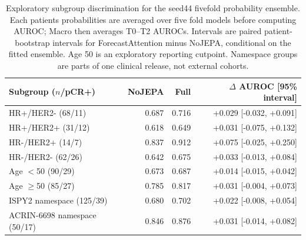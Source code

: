 \begin{table}[t]
\centering
\small
\caption{Exploratory subgroup discrimination for the seed44 fivefold probability ensemble. Each patient\textquotesingle s probabilities are averaged over five fold models before computing AUROC; Macro then averages T0--T2 AUROCs. Intervals are paired patient-bootstrap intervals for ForecastAttention minus NoJEPA, conditional on the fitted ensemble. Age 50 is an exploratory reporting cutpoint. Namespace groups are parts of one clinical release, not external cohorts.}
\label{tab:subgroups}
\begin{tabular}{lrrr}
\toprule
Subgroup ($n$/pCR+) & NoJEPA & Full & $\Delta$ AUROC [95\% interval] \\
\midrule
HR+/HER2- (68/11) & 0.687 & 0.716 & +0.029 [-0.032, +0.091] \\
HR+/HER2+ (31/12) & 0.618 & 0.649 & +0.031 [-0.075, +0.132] \\
HR-/HER2+ (14/7) & 0.837 & 0.912 & +0.075 [-0.025, +0.250] \\
HR-/HER2- (62/26) & 0.642 & 0.675 & +0.033 [-0.013, +0.084] \\
Age $<$50 (90/29) & 0.673 & 0.687 & +0.014 [-0.015, +0.042] \\
Age $\geq$50 (85/27) & 0.785 & 0.817 & +0.031 [-0.004, +0.073] \\
ISPY2 namespace (125/39) & 0.680 & 0.702 & +0.022 [-0.008, +0.054] \\
ACRIN-6698 namespace (50/17) & 0.846 & 0.876 & +0.031 [-0.014, +0.082] \\
\bottomrule
\end{tabular}
\end{table}
